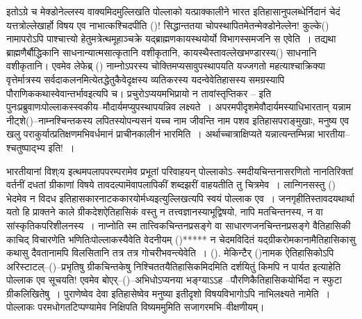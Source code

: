 इतोऽग्रे च मेक्डोनेल्लस्य वाक्यमिदमुल्लिखति पोल्लाको यत्प्राक्कालीने भारत इतिहासानुपलब्धेर्निदानं चेदं यत्तत्रोल्लेखार्हो विषय एव नाभात्कश्चिदपीति ()! सिद्धान्ततया चोपस्थापितमेतन्मेक्डोनेल्लेन! कुल्के() नामापरोऽपि पाश्चात्त्यो हेतुमत्रेत्थमूहाञ्चक्रे यद्ब्राह्मणकायस्थयोर्यो विभागस्समजनि स एवेति~। तद्यथा ब्राह्मणैर्बौद्धिकानि साधनान्यात्मसात्कृतानि वशीकृतानि, कायस्थैस्तावल्लेखभण्डारस्य() साधनानि वशीकृतानि। एवमेव लेफेब्र् () नाम्नोऽपरस्य चोक्तिमप्यसावुपस्थापयति यज्जगतो महत्याश्चाक्रिक्या वृत्तेर्मात्रस्य सर्वदाकलनमित्येतद्धेतुकैवेदृक्षस्य व्यतिकरस्य यदन्वेवेतिहासस्य समग्रस्यापि पौराणिककथास्वेवान्तर्भाव\break इत्यपि च। प्रचुरोऽप्ययमभिप्रायो न तावांस्तृप्तिकर – इति पुनःप्रब्रुवाणःपोल्लाकस्स्वकीय–\break मौदार्यमप्युपस्थापयन्निव लक्ष्यते~। अपरमपीदृशमेवौदार्यमस्याधिभारतान् यन्नाम नीट्शे\break ()–नाम्नश्चिन्तकस्य लपितस्योपन्यसनं यच्च नाम जीवन्ति नाम पशव इतिहासपराङ्मुखाः, मनुष्य एव खलु पराकुर्यात्प्रतिक्षणमभिवर्धमानं प्राचीनकालीनं भारमिति~। अर्थाच्चात्राक्षिप्यते यन्नात्यन्तम्भिन्ना भारतीया–श्चतुष्पाद्भ्य इति!~।

भारतीयानां विश्ःय इत्थमपलापपरम्परामेव प्रभूतां परिवाहयन् पोल्लाकोऽ–स्मदीयचिन्तनासर\-णितो नानतिरिक्तां वर्तनीं दधतां ग्रीकाणां विषये तावदल्पामॆवापलापिकीं शब्दझरीं वाहयतीति तु चित्रमेव~। लान्गिनसस्तु () भेदमेव न विदध इतिहासकारनाटककारयोर्मध्य\break इत्युल्लिखत्यपि स्वयं पोल्लाक एव~। जनगृहीतिस्तावदयथार्था यतो हि प्राक्तने काले ग्रीकदेश\break ऐतिहासिकं वस्तु न तत्त्वज्ञानस्याभूद्विषयो, नापि मतचिन्तनस्य, न वा सांस्कृतिकपरिशीलनस्य~। नाप्नोति स्म तात्त्विकचिन्तनप्रसङ्गे वा साधारणजनचिन्तनप्रसङ्गे वैतिहासिकी काचिद् विचारणेति भणितिःपोल्लाकस्यैवेति वेदनीयम् ()***** न चेदमविदितं यद्ग्रीकरोमकानामैतिहासिकासु कथासु दैवतानामपि विलसितानि तत्र तत्र गोचरीभवन्त्येवेति~। (). मेकिन्टैर् ()नामक ऐतिहासिकोऽपि अरिस्टाटल्–()–प्रभृतिषु ग्रीकचिन्तकेषु निश्चिततयैतिहासिकमिदमिति दर्शयितुं किमपि न पार्यत इत्याहेति पोल्लाक एव सूचयति! एवमेव बोएर्–()–अभिधोऽप्यनया भङ्ग्याऽऽह –\break पौरणिकैतिहासिकयोर्भिदा न स्फुटा ग्रीकलिखितेषु~। पुराणेष्वेव देवा इतिहासेष्वेव मनुष्या इतीदृशो विषयविभागोऽपि नाभिलक्ष्यते नामेति~। पोल्लाकः परमधोगतटिप्पण्यामेव निक्षिपति विष्यममुमिति सजागरमभि–वीक्षणीयम्।

